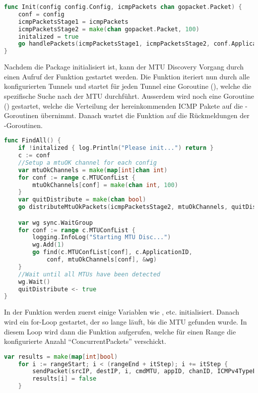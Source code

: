 \begin{lstlisting}[language=go, caption=mtu.Init(..) Funktion]                    
func Init(config config.Config, icmpPackets chan gopacket.Packet) {
	conf = config
	icmpPacketsStage1 = icmpPackets
	icmpPacketsStage2 = make(chan gopacket.Packet, 100)
	initalized = true
	go handlePackets(icmpPacketsStage1, icmpPacketsStage2, conf.ApplicationID)
}
\end{lstlisting}

Nachdem die Package initialisiert ist, kann der \ac{MTU} Discovery Vorgang durch einen Aufruf der  Funktion gestartet werden. Die  Funktion iteriert nun durch alle konfigurierten Tunnels und startet für jeden Tunnel eine Goroutine (), welche die spezifische Suche nach der \ac{MTU} durchführt.
Ausserdem wird noch eine Goroutine () gestartet, welche die Verteilung der hereinkommenden \ac{ICMP} Pakete auf die -Goroutinen übernimmt.
Danach wartet die  Funktion auf die Rückmeldungen der -Goroutinen.

\begin{lstlisting}[language=go, caption=mtu.FindAll(..) Funktion]                    
func FindAll() {
	if !initalized { log.Println("Please init...") return }
	c := conf
	//Setup a mtuOK channel for each config
	var mtuOkChannels = make(map[int]chan int)
	for conf := range c.MTUConfList {
		mtuOkChannels[conf] = make(chan int, 100)
	}
	var quitDistribute = make(chan bool)
	go distributeMtuOkPackets(icmpPacketsStage2, mtuOkChannels, quitDistribute)

	var wg sync.WaitGroup
	for conf := range c.MTUConfList {
		logging.InfoLog("Starting MTU Disc...")
		wg.Add(1)
		go find(c.MTUConfList[conf], c.ApplicationID,
			conf, mtuOkChannels[conf], &wg)
	}
	//Wait until all MTUs have been detected
	wg.Wait()
	quitDistribute <- true
}
\end{lstlisting}

In der  Funktion werden zuerst einige Variablen wie ,  etc. initialisiert. Danach wird ein for-Loop gestartet, der so lange läuft, bis die \ac{MTU} gefunden wurde. In diesem Loop wird dann die  Funktion aufgerufen, welche für einen Range die konfigurierte Anzahl \enquote{ConcurrentPackets} verschickt.

\begin{lstlisting}[language=go, caption=Ein Batch von Paketen verschicken]                    
	var results = make(map[int]bool)
	for i := rangeStart; i < (rangeEnd + itStep); i += itStep {
		sendPacket(srcIP, destIP, i, cmdMTU, appID, chanID, ICMPv4TypeEchoRequest)
		results[i] = false
	}
\end{lstlisting}

